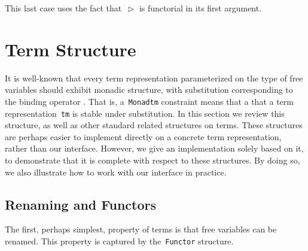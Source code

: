 \documentclass[9pt,preprint,authoryear]{sigplanconf}
\begin{document}
{{{}\vphantom{$\{$}}}%


%
This last case uses the fact that{~}\textcolor[cmyk]{0,0.65,0.99,0}{\texttt{\makebox[1.22ex][l]{$ {(} $}}}\textcolor[rgb]{0,0,0.80}{\texttt{$ \vartriangleright $}}\textcolor[cmyk]{0,0.65,0.99,0}{\texttt{\makebox[1.22ex][r]{$ {)} $}}} is functorial in its first argument.%


\section{Term Structure\label{termStructure}}

%
It is well-known that every term representation parameterized
    on the type of free variables should exhibit monadic structure,
    with substitution corresponding to the binding operator \cite{bellegarde-94,bird-paterson-99,altenkirch-reus-99}. That is, a{~}\textcolor[rgb]{0,0,0.80}{\texttt{Monad}}\textcolor[rgb]{0,0,0.80}{\texttt{\mbox{\hspace{0.50em}}}}\textcolor[rgb]{0,0,0.80}{\texttt{tm}} constraint means that a that
    a term representation{~}\textcolor[rgb]{0,0,0.80}{\texttt{tm}} is stable under substitution. In
    this section we review this structure, as well as other standard
    related structures on terms. These structures are perhaps easier
    to implement directly on a concrete term representation, rather
    than our interface. However, we give an implementation solely based
    on it, to demonstrate that it is complete with respect to these
    structures. By doing so, we also illustrate how to work with our
    interface in practice.%


\subsection{Renaming and Functors\label{functorSec}}

%
The first, perhaps simplest, property of terms is that free
    variables can be renamed. This property is captured by
    the{~}\textcolor[rgb]{0,0,0.80}{\texttt{Functor}} structure.%
\end{document}

